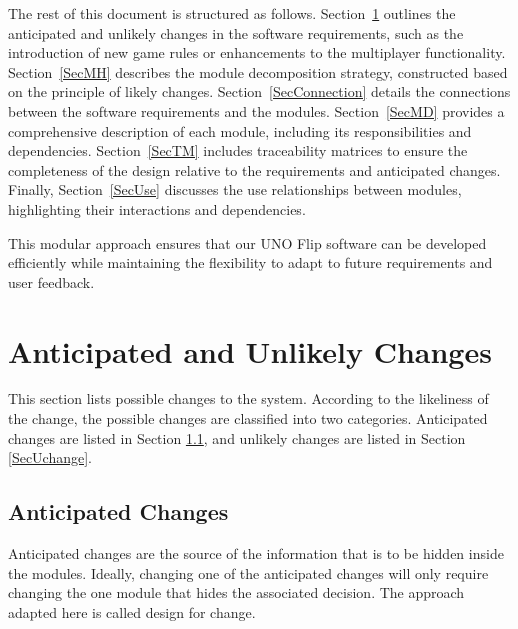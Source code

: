 \documentclass[12pt, titlepage]{article}
\begin{document}
The rest of this document is structured as follows. Section~\ref{SecChange} outlines the anticipated and unlikely changes in the software requirements, such as the introduction of new game rules or enhancements to the multiplayer functionality. Section~\ref{SecMH} describes the module decomposition strategy, constructed based on the principle of likely changes. Section~\ref{SecConnection} details the connections between the software requirements and the modules. Section~\ref{SecMD} provides a comprehensive description of each module, including its responsibilities and dependencies. Section~\ref{SecTM} includes traceability matrices to ensure the completeness of the design relative to the requirements and anticipated changes. Finally, Section~\ref{SecUse} discusses the use relationships between modules, highlighting their interactions and dependencies.

This modular approach ensures that our UNO Flip software can be developed efficiently while maintaining the flexibility to adapt to future requirements and user feedback.

\section{Anticipated and Unlikely Changes} \label{SecChange}

This section lists possible changes to the system. According to the likeliness
of the change, the possible changes are classified into two
categories. Anticipated changes are listed in Section \ref{SecAchange}, and
unlikely changes are listed in Section \ref{SecUchange}.

\subsection{Anticipated Changes} \label{SecAchange}

Anticipated changes are the source of the information that is to be hidden
inside the modules. Ideally, changing one of the anticipated changes will only
require changing the one module that hides the associated decision. The approach
adapted here is called design for change.
\end{document}
